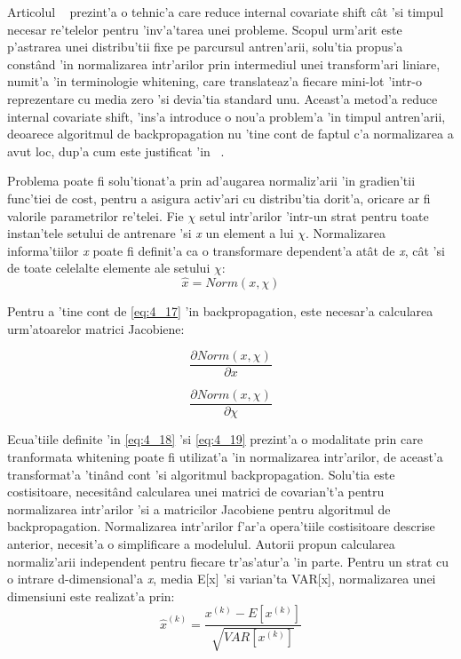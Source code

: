\documentclass[12pt,a4paper,twoside]{report}
\begin{document}
Articolul ~\cite{BatchNormalization} prezint'a o tehnic'a care reduce internal covariate shift c\^at 'si timpul necesar re'telelor pentru 'inv'a'tarea unei probleme. Scopul urm'arit este p'astrarea unei distribu'tii fixe pe parcursul antren'arii, solu'tia propus'a const\^and 'in normalizarea intr'arilor prin intermediul unei transform'ari liniare, numit'a 'in terminologie whitening, care translateaz'a fiecare mini-lot 'intr-o reprezentare cu media zero 'si devia'tia standard unu. Aceast'a metod'a reduce internal covariate shift, 'ins'a introduce o nou'a problem'a 'in timpul antren'arii, deoarece algoritmul de backpropagation nu 'tine cont de faptul c'a normalizarea a avut loc, dup'a cum este justificat 'in ~\cite{BatchNormalization}.

Problema poate fi solu'tionat'a prin ad'augarea normaliz'arii 'in gradien'tii func'tiei de cost, pentru a asigura activ'ari cu distribu'tia dorit'a, oricare ar fi valorile parametrilor re'telei. Fie $\chi$ setul intr'arilor 'intr-un strat pentru toate instan'tele setului de antrenare 'si \textit{x} un element a lui $\chi$. Normalizarea informa'tiilor \textit{x} poate fi definit'a ca o transformare dependent'a at\^at de \textit{x}, c\^at 'si de toate celelalte elemente ale setului $\chi$:
\begin{equation}
\hat{x} = Norm(x, \chi)
\label{eq:4_17}
\end{equation}

Pentru a 'tine cont de \ref{eq:4_17} 'in backpropagation, este necesar'a calcularea urm'atoarelor matrici Jacobiene:

\begin{equation}  
\frac{\partial Norm(x, \chi)}{\partial x}
\label{eq:4_18}
\end{equation} 

\begin{equation}  
\frac{\partial Norm(x, \chi)}{\partial \chi} 
\label{eq:4_19}
\end{equation}  

Ecua'tiile definite 'in \ref{eq:4_18} 'si \ref{eq:4_19} prezint'a o modalitate prin care tranformata whitening poate fi utilizat'a 'in normalizarea intr'arilor, de aceast'a transformat'a 'tin\^and cont 'si algoritmul backpropagation. Solu'tia este costisitoare, necesit\^and calcularea unei matrici de covarian't'a pentru normalizarea intr'arilor 'si a matricilor Jacobiene pentru algoritmul de backpropagation. Normalizarea intr'arilor f'ar'a opera'tiile costisitoare descrise anterior, necesit'a o simplificare a modelulul. Autorii propun calcularea normaliz'arii independent pentru fiecare tr'as'atur'a 'in parte. Pentru un strat cu o intrare d-dimensional'a \textit{x}, media E[x] 'si varian'ta VAR[x], normalizarea unei dimensiuni este realizat'a prin:
\begin{equation}
\hat{x}^{(k)} = \frac{x^{(k)} - E[x^{(k)}]}{\sqrt{VAR[x^{(k)}]}}
\end{equation}
\end{document}
